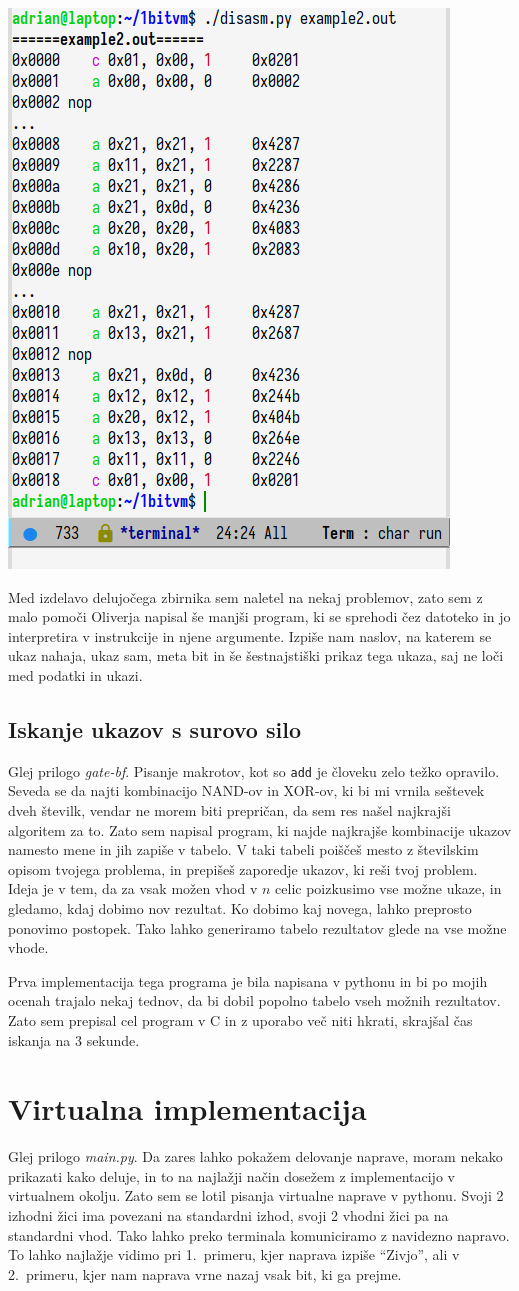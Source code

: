 \documentclass[12pt]{article}
\begin{document}
\begin{center}
  \includegraphics[width=.3\linewidth]{slike/razbirnik.png}
\end{center}
Med izdelavo delujočega zbirnika sem naletel na nekaj problemov, zato sem z malo pomoči Oliverja napisal še manjši program, ki se sprehodi čez datoteko in jo interpretira v instrukcije in njene argumente.
Izpiše nam naslov, na katerem se ukaz nahaja, ukaz sam, meta bit in še šestnajstiški prikaz tega ukaza, saj ne loči med podatki in ukazi.

\subsection{Iskanje ukazov s surovo silo}
Glej prilogo \textit{gate-bf}.
Pisanje makrotov, kot so \texttt{add} je človeku zelo težko opravilo.
Seveda se da najti kombinacijo NAND-ov in XOR-ov, ki bi mi vrnila seštevek dveh številk, vendar ne morem biti prepričan, da sem res našel najkrajši algoritem za to.
Zato sem napisal program, ki najde najkrajše kombinacije ukazov namesto mene in jih zapiše v tabelo.
V taki tabeli poiščeš mesto z številskim opisom tvojega problema, in prepišeš zaporedje ukazov, ki reši tvoj problem.
Ideja je v tem, da za vsak možen vhod v $n$ celic poizkusimo vse možne ukaze, in gledamo, kdaj dobimo nov rezultat.
Ko dobimo kaj novega, lahko preprosto ponovimo postopek.
Tako lahko generiramo tabelo rezultatov glede na vse možne vhode.

Prva implementacija tega programa je bila napisana v pythonu in bi po mojih ocenah trajalo nekaj tednov, da bi dobil popolno tabelo vseh možnih rezultatov.
Zato sem prepisal cel program v C in z uporabo več niti hkrati, skrajšal čas iskanja na 3 sekunde.

\section{Virtualna implementacija}
Glej prilogo \textit{main.py}.
Da zares lahko pokažem delovanje naprave, moram nekako prikazati kako deluje, in to na najlažji način dosežem z implementacijo v virtualnem okolju.
Zato sem se lotil pisanja virtualne naprave v pythonu.
Svoji 2 izhodni žici ima povezani na standardni izhod, svoji 2 vhodni žici pa na standardni vhod.
Tako lahko preko terminala komuniciramo z navidezno napravo.
To lahko najlažje vidimo pri 1.\ primeru, kjer naprava izpiše ``Zivjo'', ali v 2.\ primeru, kjer nam naprava vrne nazaj vsak bit, ki ga prejme.
\end{document}
